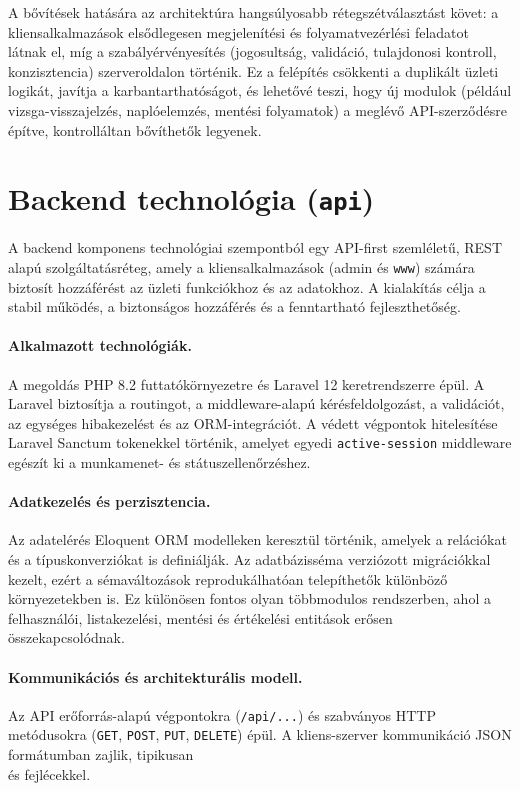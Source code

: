 \documentclass{thesis-ekf}
\begin{document}
A bővítések hatására az architektúra hangsúlyosabb rétegszétválasztást követ: a kliensalkalmazások elsődlegesen megjelenítési és folyamatvezérlési feladatot látnak el, míg a szabályérvényesítés (jogosultság, validáció, tulajdonosi kontroll, konzisztencia) szerveroldalon történik. Ez a felépítés csökkenti a duplikált üzleti logikát, javítja a karbantarthatóságot, és lehetővé teszi, hogy új modulok (például vizsga-visszajelzés, naplóelemzés, mentési folyamatok) a meglévő API-szerződésre építve, kontrolláltan bővíthetők legyenek.

\section{Backend technológia (\texttt{api})}
A backend komponens technológiai szempontból egy API-first szemléletű, REST alapú szolgáltatásréteg, amely a kliensalkalmazások (admin és \texttt{www}) számára biztosít hozzáférést az üzleti funkciókhoz és az adatokhoz. A kialakítás célja a stabil működés, a biztonságos hozzáférés és a fenntartható fejleszthetőség.

\paragraph{Alkalmazott technológiák.}
A megoldás PHP 8.2 futtatókörnyezetre \cite{php-docs} és Laravel 12 keretrendszerre \cite{laravel} épül. A Laravel biztosítja a routingot, a middleware-alapú kérésfeldolgozást, a validációt, az egységes hibakezelést és az ORM-integrációt. A védett végpontok hitelesítése Laravel Sanctum tokenekkel \cite{sanctum} történik, amelyet egyedi \texttt{active-session} middleware egészít ki a munkamenet- és státuszellenőrzéshez.

\paragraph{Adatkezelés és perzisztencia.}
Az adatelérés Eloquent ORM modelleken \cite{eloquent-orm} keresztül történik, amelyek a relációkat és a típuskonverziókat is definiálják. Az adatbázisséma verziózott migrációkkal kezelt, ezért a sémaváltozások reprodukálhatóan telepíthetők különböző környezetekben is. Ez különösen fontos olyan többmodulos rendszerben, ahol a felhasználói, listakezelési, mentési és értékelési entitások erősen összekapcsolódnak.

\paragraph{Kommunikációs és architekturális modell.}
Az API erőforrás-alapú végpontokra (\texttt{/api/...}) és szabványos HTTP metódusokra (\texttt{GET}, \texttt{POST}, \texttt{PUT}, \texttt{DELETE}) épül. A kliens-szerver kommunikáció JSON formátumban \cite{json-org} zajlik, tipikusan\\
 és  fejlécekkel.
\end{document}
